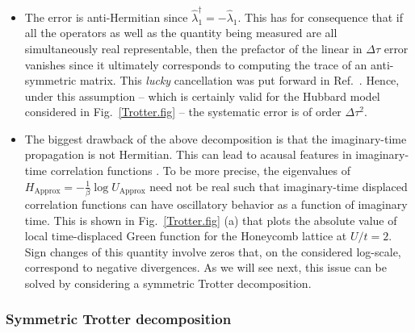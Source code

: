 \begin{itemize}
\item    The error is anti-Hermitian  since $\hat{\lambda}_1^{\dagger} = - \hat{\lambda}_1 $.  This has for consequence that if all the operators as well as the quantity being measured are all  simultaneously real representable,  then   the prefactor of the linear in $\Delta  \tau$ error vanishes since it ultimately corresponds to computing the trace of an  anti-symmetric matrix. This \textit{lucky}   cancellation was put forward in  Ref.~\cite{Fye86}.   Hence, under this assumption -- which is certainly valid for the Hubbard model considered in Fig.~\ref{Trotter.fig} -- the systematic error is of order $\Delta \tau^2$.
\item  The biggest drawback  of the above decomposition is that  the imaginary-time propagation is not Hermitian.   This can lead to acausal  features in imaginary-time correlation functions \cite{Beyl_thesis}. To be more precise, the eigenvalues of  
$  H_{\text{Approx}} = - \frac{1}{\beta} \log  U_{\text{Approx}}$   need not be real such that imaginary-time displaced correlation functions can  have oscillatory behavior as a function of imaginary time.   
This is shown in  Fig.~\ref{Trotter.fig} (a)  that plots the  absolute value of local time-displaced Green function for  the Honeycomb lattice at $U/t=2$.  Sign changes of this quantity   involve zeros  that, on the considered log-scale,  correspond to negative divergences.
As we will see next, this issue can be solved by considering a symmetric  Trotter decomposition. 
\end{itemize}


\subsubsection{ Symmetric Trotter decomposition } 

